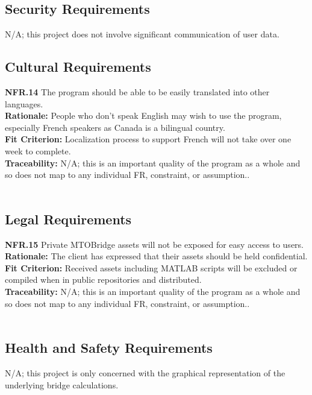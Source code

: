 \documentclass[12pt]{article}
\begin{document}
\subsection{Security Requirements}

N/A; this project does not involve significant communication of user data.\\

\subsection{Cultural Requirements}

  \textbf{NFR.14} The program should be able to be easily translated into other languages.\\
  \textbf{Rationale:} People who don't speak English may wish to use the program, especially French speakers as Canada is a bilingual country.\\
  \textbf{Fit Criterion:} Localization process to support French will not take over one week to complete.\\
  \textbf{Traceability:} N/A; this is an important quality of the program as a whole and so does not map to any individual FR, constraint, or assumption..\\\\

\subsection{Legal Requirements}

  \textbf{NFR.15} Private MTOBridge assets will not be exposed for easy access to users.\\
  \textbf{Rationale:} The client has expressed that their assets should be held confidential.\\
  \textbf{Fit Criterion:} Received assets including MATLAB scripts will be excluded or compiled when in public repositories and distributed.\\
  \textbf{Traceability:} N/A; this is an important quality of the program as a whole and so does not map to any individual FR, constraint, or assumption..\\\\

\subsection{Health and Safety Requirements}

N/A; this project is only concerned with the graphical representation of the underlying bridge calculations.\\
\end{document}
